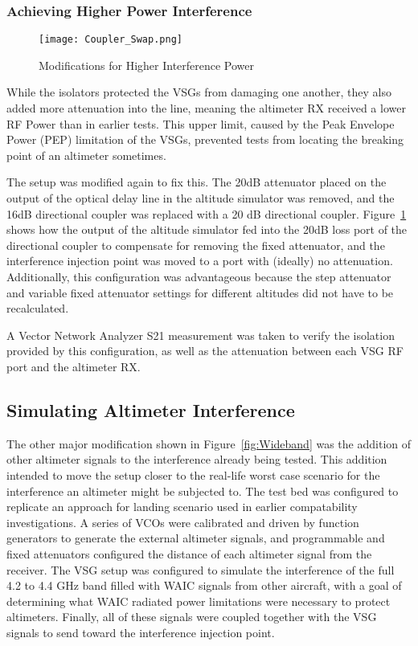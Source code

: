 \subsubsection{Achieving Higher Power Interference}

\begin{figure}[ht]
\centering
\texttt{[image: Coupler\_Swap.png]}
\caption{Modifications for Higher Interference Power}

\label{fig:coupler_swap}

\end{figure}


While the isolators protected the VSGs from damaging one another, they also added more attenuation into the line, meaning the altimeter RX received a lower RF Power than in earlier tests. This upper limit, caused by the Peak Envelope Power (PEP) limitation of the VSGs, prevented tests from locating the breaking point of an altimeter sometimes. 


The setup was modified again to fix this. The 20dB attenuator placed on the output of the optical delay line in the altitude simulator was removed, and the 16dB directional coupler was replaced with a 20 dB directional coupler. Figure~\ref{fig:coupler_swap} shows how the output of the altitude simulator fed into the 20dB loss port of the directional coupler to compensate for removing the fixed attenuator, and the interference injection point was moved to a port with (ideally) no attenuation. Additionally, this configuration was advantageous because the step attenuator and variable fixed attenuator settings for different altitudes did not have to be recalculated. 

A Vector Network Analyzer S21 measurement was taken to verify the isolation provided by this configuration, as well as the attenuation between each VSG RF port and the altimeter RX. 

\subsection{Simulating Altimeter Interference}
The other major modification shown in Figure~\ref{fig:Wideband} was the addition of other altimeter signals to the interference already being tested. This addition intended to move the setup closer to the real-life worst case scenario for the interference an altimeter might be subjected to. The test bed was configured to replicate an approach for landing scenario used in earlier compatability investigations. A series of VCOs were calibrated and driven by function generators to generate the external altimeter signals, and programmable and fixed attenuators configured the distance of each altimeter signal from the receiver. The VSG setup was configured to simulate the interference of the full 4.2 to 4.4 GHz band filled with WAIC signals from other aircraft, with a goal of determining what WAIC radiated power limitations were necessary to protect altimeters. Finally, all of these signals were coupled together with the VSG signals to send toward the interference injection point. 


